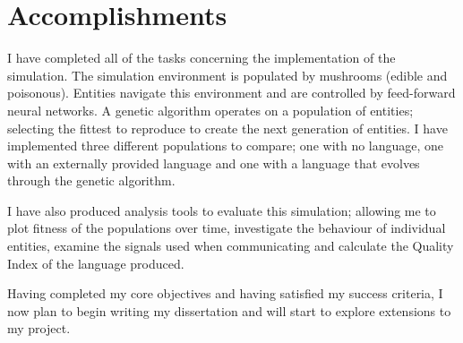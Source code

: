 \documentclass[12pt]{article}
\begin{document}
\section*{Accomplishments}

I have completed all of the tasks concerning the implementation of the simulation. The simulation environment is populated by mushrooms (edible and poisonous). Entities navigate this environment and are controlled by feed-forward neural networks. A genetic algorithm operates on a population of entities; selecting the fittest to reproduce to create the next generation of entities. I have implemented three different populations to compare; one with no language, one with an externally provided language and one with a language that evolves through the genetic algorithm.

I have also produced analysis tools to evaluate this simulation; allowing me to plot fitness of the populations over time, investigate the behaviour of individual entities, examine the signals used when communicating and calculate the Quality Index of the language produced.

Having completed my core objectives and having satisfied my success criteria, I now plan to begin writing my dissertation and will start to explore extensions to my project.

 
\end{document}
